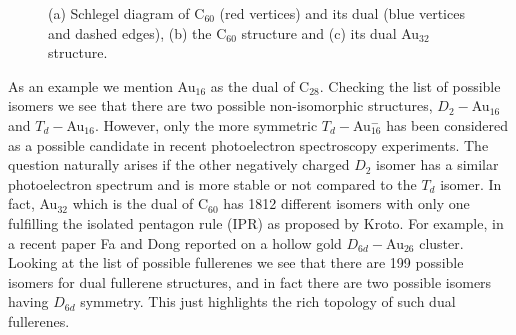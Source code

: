\begin{figure}[htbp]
\begin{center}
	\hfill
    \hfill
\caption{(a) Schlegel diagram of C$_{60}$ (red vertices) and its dual (blue vertices and dashed edges), (b) the C$_{60}$ structure and (c) its dual Au$_{32}$ structure.}
\label{fig:C60dual}
\end{center}
\end{figure}

As an example we mention Au$_{16}$ as the dual of C$_{28}$. Checking the list of possible isomers\autocite{Brinkmann_HouseGraphsdatabase_2013} we see that there are two possible non-isomorphic structures, $D_2-$Au$_{16}$ and $T_d-$Au$_{16}$. However, only the more symmetric $T_d-$Au$_{16}^-$ has been considered as a possible candidate in recent photoelectron spectroscopy experiments.\autocite{Bulusu_Evidencehollowgolden_2006} The question naturally arises if the other negatively charged $D_2$ isomer has a similar photoelectron spectrum and is more stable or not compared to the $T_d$ isomer. In fact, Au$_{32}$ which is the dual of C$_{60}$ has 1812 different isomers with only one fulfilling the isolated pentagon rule (IPR) as proposed by Kroto.\autocite{Kroto_stabilityfullerenesCn_1987} For example, in a recent paper Fa and Dong reported on a hollow gold $D_{6d}-$Au$_{26}$ cluster.\autocite{Fa-Dong-2006,Fa-Luong-2008} Looking at the list of possible fullerenes we see that there are 199 possible isomers for dual fullerene structures, and in fact there are two possible isomers having $D_{6d}$ symmetry. This just highlights the rich topology of such dual fullerenes.

